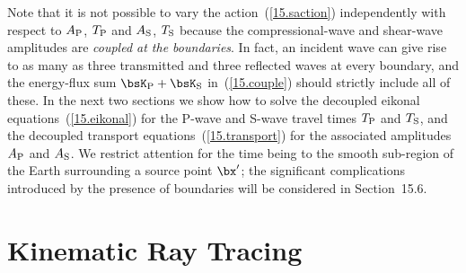 Note that it is not possible to vary the action~(\ref{15.saction})
independently with respect to $A_{\rm P}$, $T_{\rm P}$ and $A_{\rm S}$,
$T_{\rm S}$ because the compressional-wave and shear-wave amplitudes
are {\em coupled at the boundaries\/}.  In fact, an incident wave can
give rise to as many as three transmitted and three reflected waves
at every boundary, and the energy-flux sum $\bsK_{\rm P}+\bsK_{\rm S}$
in~(\ref{15.couple}) should strictly include all of these.
In the next two sections we show how to solve the
decoupled eikonal equations~(\ref{15.eikonal}) for
the P-wave and S-wave travel times
$T_{\rm P}$ and $T_{\rm S}$, and the decoupled transport
equations~(\ref{15.transport}) for the associated amplitudes
$A_{\rm P}$ and $A_{\rm S}$.
We restrict attention for the time being to the smooth sub-region
of the Earth surrounding a source point $\bx'$; the significant
complications introduced by the presence of boundaries will be
considered in Section~15.6.
%
%
%
%

\section{Kinematic Ray Tracing}
%
%


